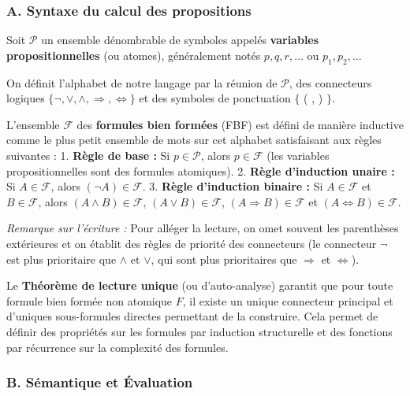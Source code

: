 \documentclass[11pt,a4paper]{article}
\begin{document}
\hypertarget{a.-syntaxe-du-calcul-des-propositions}{%
\subsubsection{A. Syntaxe du calcul des
propositions}\label{a.-syntaxe-du-calcul-des-propositions}}

Soit \(\mathcal{P}\) un ensemble dénombrable de symboles appelés
\textbf{variables propositionnelles} (ou atomes), généralement notés
\(p, q, r, \dots\) ou \(p_1, p_2, \dots\)

On définit l'alphabet de notre langage par la réunion de
\(\mathcal{P}\), des connecteurs logiques
\(\{\neg, \lor, \land, \Rightarrow, \Leftrightarrow\}\) et des symboles
de ponctuation \(\{\) ( , ) \(\}\).

L'ensemble \(\mathcal{F}\) des \textbf{formules bien formées} (FBF) est
défini de manière inductive comme le plus petit ensemble de mots sur cet
alphabet satisfaisant aux règles suivantes : 1. \textbf{Règle de base :}
Si \(p \in \mathcal{P}\), alors \(p \in \mathcal{F}\) (les variables
propositionnelles sont des formules atomiques). 2. \textbf{Règle
d'induction unaire :} Si \(A \in \mathcal{F}\), alors
\((\neg A) \in \mathcal{F}\). 3. \textbf{Règle d'induction binaire :} Si
\(A \in \mathcal{F}\) et \(B \in \mathcal{F}\), alors
\((A \land B) \in \mathcal{F}\), \((A \lor B) \in \mathcal{F}\),
\((A \Rightarrow B) \in \mathcal{F}\) et
\((A \Leftrightarrow B) \in \mathcal{F}\).

\emph{Remarque sur l'écriture :} Pour alléger la lecture, on omet
souvent les parenthèses extérieures et on établit des règles de priorité
des connecteurs (le connecteur \(\neg\) est plus prioritaire que
\(\land\) et \(\lor\), qui sont plus prioritaires que \(\Rightarrow\) et
\(\Leftrightarrow\)).

Le \textbf{Théorème de lecture unique} (ou d'auto-analyse) garantit que
pour toute formule bien formée non atomique \(F\), il existe un unique
connecteur principal et d'uniques sous-formules directes permettant de
la construire. Cela permet de définir des propriétés sur les formules
par induction structurelle et des fonctions par récurrence sur la
complexité des formules.

\hypertarget{b.-suxe9mantique-et-uxe9valuation}{%
\subsubsection{B. Sémantique et
Évaluation}\label{b.-suxe9mantique-et-uxe9valuation}}
\end{document}
